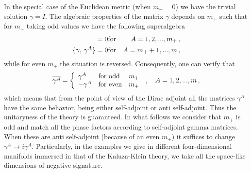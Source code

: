 \documentclass[a4paper,12pt]{article}
\begin{document}
In the special case of the Euclidean metric (when $ m_{-}=0$) we have 
the trivial solution $\gamma=I$. The algebraic properties of the matrix 
$\gamma$   
depends on  $m_{+}$ such that for $ m_{+}$ taking odd values 
we have  the following superalgebra
\begin{eqnarray}
[\gamma,\,\gamma^{A}]=0& {\rm for}& A=1,2,...,m_{+}\,,
\nonumber\\
\{\gamma,\,\gamma^{A}\}=0& {\rm for}& A=m_{+}+1,...,m\,,
\end{eqnarray}
while for even $ m_{+}$ the situation is reversed. Consequently, one 
can verify that 
\begin{equation}
\overline{\gamma^{A}}=\left\{
\begin{array}{lll}
\gamma^{A}& {\rm for~ odd}& m_{+}\\ 
-\gamma^{A}& {\rm for~ even}& m_{+}   
\end{array}\right.\,,\quad  A=1,2,...,m\,, 
\end{equation}  
which means that from the point of view of the Dirac adjoint all the 
matrices $\gamma^A$ have the same behavior, being either self-adjoint 
or anti self-adjoint. Thus the unitaryness of the theory is guaranteed.
In what follows we consider that $m_{+}$ is odd and match all the phase 
factors according to self-adjoint gamma matrices. When these are anti 
self-adjoint (because of an even $m_{+}$) it suffices to change 
$\gamma^A\to i\gamma^A$.  
Particularly, in the examples we give in different four-dimensional 
manifolds immersed in that of the Kaluza-Klein theory, we take all the  
space-like dimensions of negative signature. 
\end{document}
